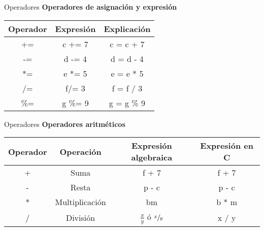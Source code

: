 \begin{frame}[t]{Operadores}
\textbf{Operadores de asignación y expresión}\\
\begin{center}
	\begin{tabular}{ccc}
		\toprule
		\textbf{Operador} & \textbf{Expresión} & \textbf{Explicación} \\
		\midrule
		+= & c += 7 & c = c + 7 \\ \hline
		-= & d -= 4 & d = d - 4 \\ \hline
		*= & e *= 5 & e = e * 5 \\ \hline
		/= & f/= 3 & f = f / 3 \\ \hline
		\hspace{1mm} \%= & g \%= 9 & g = g \% 9 \\
		\bottomrule
	\end{tabular}
\end{center}
\end{frame}

\begin{frame}[t]{Operadores}
\textbf{Operadores aritméticos}\\
\vspace{5mm}
\small
\begin{center}
	\begin{tabular}{cccc}
		\toprule
		\textbf{Operador} & \textbf{Operación} & \textbf{Expresión algebraica} & \textbf{Expresión en C}\\
		\midrule
		+ & Suma & f + 7 & f + 7 \\ \hline
		- & Resta & p - c & p - c\\ \hline
		* & Multiplicación & bm & b * m\\ \hline
		/ & División & $\frac{x}{y}$ ó $\sfrac{x}{y}$ & x / y \\ \hline
	\end{tabular}
\end{center}
\end{frame}

